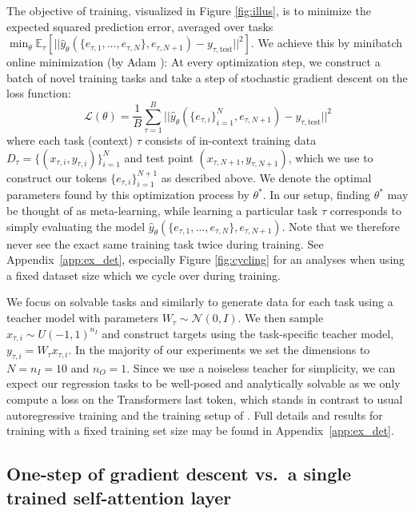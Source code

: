 \documentclass{article}
\theoremstyle{plain}
\theoremstyle{definition}
\theoremstyle{remark}
\begin{document}
The objective of training, visualized in Figure \ref{fig:illus}, is to minimize the expected squared prediction error, averaged over tasks $\min_\theta \mathbb{E}_\tau [||\hat{y}_{\theta}(\{e_{\tau,1}, \ldots, e_{\tau,N}\}, e_{\tau, N+1}) - y_{\tau,\text{test}}||^2]$. We achieve this by minibatch online minimization (by Adam \citep{adam}): At every optimization step, we construct a batch of novel training tasks and take a step of stochastic gradient descent on the loss function:
\begin{equation}
\label{eq:trans_loss}
     \mathcal{L}(\theta) = \frac{1}{B} \sum_{\tau=1}^B ||\hat{y}_{\theta}(\{e_{\tau,i}\}_{i=1}^N, e_{\tau, N+1}) - y_{\tau,\text{test}}||^2
\end{equation}
where each task (context) $\tau$ consists of in-context training data  $D_\tau=\{(x_{\tau,i}, y_{\tau,i})\}_{i=1}^{N}$ and test point $(x_{\tau,N+1}, y_{\tau,N+1})$, which we use to construct our tokens $\{e_{\tau,i}\}_{i=1}^{N+1}$ as described above. We denote the optimal parameters found by this optimization process by $\theta^*$. In our setup, finding $\theta^*$ may be thought of as meta-learning, while learning a particular task $\tau$ corresponds to simply evaluating the model $\hat{y}_{\theta}(\{e_{\tau,1}, \ldots, e_{\tau,N}\}, e_{\tau, N+1})$. Note that we therefore never see the exact same training task twice during training. See Appendix~\ref{app:ex_det}, especially Figure \ref{fig:cycling} for an analyses when using a fixed dataset size which we cycle over during training.

We focus on solvable tasks and similarly to \citet{simple_case_study} generate data for each task using a teacher model with parameters $W_\tau \sim \mathcal{N}(0, I)$. We then sample $x_{\tau,i} \sim U(-1, 1)^{n_I}$ and construct targets using the task-specific teacher model, $y_{\tau,i} = W_\tau x_{\tau,i}$. In the majority of our experiments we set the dimensions to $N=n_I=10$ and $n_O=1$. Since we use a noiseless teacher for simplicity, we can expect our regression tasks to be well-posed and analytically solvable as we only compute a loss on the Transformers last token, which stands in contrast to usual autoregressive training and the training setup of \citet{simple_case_study}. 
Full details and results for training with a fixed training set size may be found in Appendix~\ref{app:ex_det}.


\subsection*{One-step of gradient descent vs.~a single trained self-attention layer}
\end{document}
